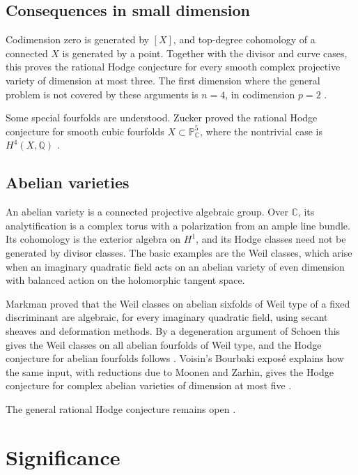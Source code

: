 \documentclass[11pt,reqno]{amsart}
\theoremstyle{definition}
\theoremstyle{remark}
\numberwithin{equation}{section}
\newcommand{\C}{\mathbb{C}}
\newcommand{\Q}{\mathbb{Q}}
\newcommand{\PP}{\mathbb{P}}
\begin{document}
\subsection{Consequences in small dimension}

Codimension zero is generated by $[X]$, and top-degree cohomology of a
connected $X$ is generated by a point. Together with the divisor and curve
cases, this proves the rational Hodge conjecture for every smooth complex
projective variety of dimension at most three. The first dimension where
the general problem is not covered by these arguments is $n=4$, in
codimension $p=2$ \cite{voisin2016hodge}.

Some special fourfolds are understood. Zucker proved the rational Hodge
conjecture for smooth cubic fourfolds $X\subset\PP^5_{\C}$, where the
nontrivial case is $H^4(X,\Q)$ \cite{zucker1977}.

\subsection{Abelian varieties}

An abelian variety is a connected projective algebraic group. Over $\C$,
its analytification is a complex torus with a polarization from an ample
line bundle. Its cohomology is the exterior algebra on $H^1$, and its Hodge
classes need not be generated by divisor classes. The basic examples are
the Weil classes, which arise when an imaginary quadratic field acts on an
abelian variety of even dimension with balanced action on the holomorphic
tangent space.

Markman proved that the Weil classes on abelian sixfolds of Weil type of a
fixed discriminant are algebraic, for every imaginary quadratic field,
using secant sheaves and deformation methods. By a degeneration argument of
Schoen this gives the Weil classes on all abelian fourfolds of Weil type,
and the Hodge conjecture for abelian fourfolds follows \cite{markman2025}.
Voisin's Bourbaki expos\'e explains how the same input, with reductions due
to Moonen and Zarhin, gives the Hodge conjecture for complex abelian
varieties of dimension at most five
\cite[Th\'eor\`eme~1.3]{voisin2026bourbaki}.

The general rational Hodge conjecture remains open \cite{cmihodge}.

\section{Significance}\label{sec:importance}
\end{document}
